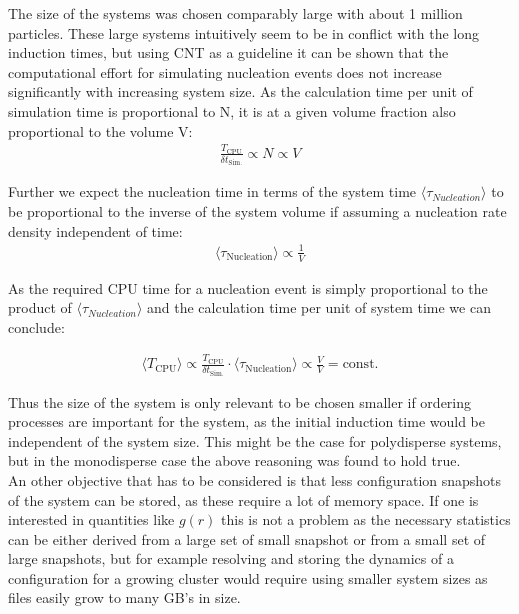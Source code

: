 The size of the systems was chosen comparably large with about 1 million particles. These large systems intuitively seem to be in conflict with the long induction times, but using CNT as a guideline it can be shown that the computational effort for simulating nucleation events does not increase significantly with increasing system size. As the calculation time per unit of simulation time is proportional to N, it is at a given volume fraction also proportional to the volume V:
\begin{align}
\label{eqn:system_size}
\frac{T_{\text{CPU}}}{\delta t_{\text{Sim.}}} \propto N \propto V 
\end{align}

Further we expect the nucleation time in terms of the system time $\langle \tau_{Nucleation} \rangle$ to be proportional to the inverse of the system volume if assuming a nucleation rate density independent of time:
\begin{align}
\langle \tau_{\text{Nucleation}} \rangle \propto \frac{1}{V}
\end{align}

As the required CPU time for a nucleation event is simply proportional to the product of $\langle \tau_{Nucleation} \rangle$ and the calculation time per unit of system time we can conclude:

\begin{align}
\langle T_{\text{CPU}} \rangle \propto  \frac{T_{\text{CPU}}}{\delta t_{\text{Sim.}}}  \cdot \langle \tau_{\text{Nucleation}} \rangle \propto \frac{V}{V} = \text{const.}
\end{align}

Thus the size of the system is only relevant to be chosen smaller if ordering processes are important for the system, as the initial induction time would be independent of the system size. This might be the case for polydisperse systems, but in the monodisperse case the above reasoning was found to hold true.\\
An other objective that has to be considered is that less configuration snapshots of the system can be stored, as these require a lot of memory space. If one is interested in quantities like $g(r)$ this is not a problem as the necessary statistics can be either derived from a large set of small snapshot or from a small set of large snapshots, but for example resolving and storing the dynamics of a configuration for a growing cluster would require using smaller system sizes as files easily grow to many GB's in size. 

